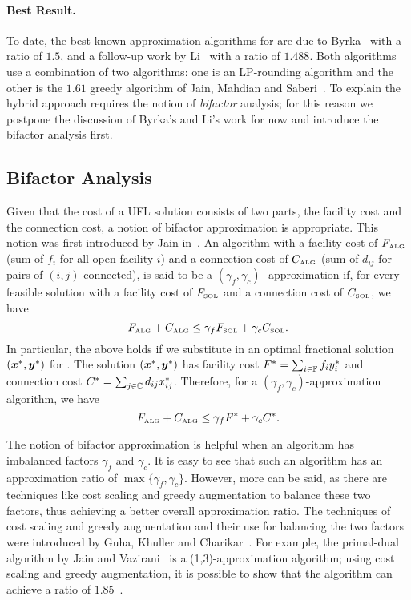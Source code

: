 \documentclass[oneside,final]{ucr}
\begin{document}
\paragraph{Best Result.} To date, the best-known
approximation algorithms for {\UFL} are due to
Byrka~\cite{Byrka07} with a ratio of $1.5$, and a follow-up
work by Li~\cite{Li11} with a ratio of $1.488$. Both
algorithms use a combination of two algorithms: one is an
LP-rounding algorithm and the other is the $1.61$ greedy
algorithm of Jain, Mahdian and Saberi~\cite{JainMS02}. To
explain the hybrid approach requires the notion of
\emph{bifactor} analysis; for this reason we postpone the
discussion of Byrka's and Li's work for now and introduce
the bifactor analysis first.

\subsection{Bifactor Analysis} \label{subsec: bifactor}
Given that the cost of a UFL solution consists of two parts,
the facility cost and the connection cost, a notion of
bifactor approximation is appropriate. This notion was first
introduced by Jain {\etal} in~\cite{JainMMSV03}. An
algorithm with a facility cost of $F_{\mbox{\tiny\rm ALG}}$ (sum of
$f_i$ for all open facility $i$) and a connection cost of
$C_{\mbox{\tiny\rm ALG}}$ (sum of $d_{ij}$ for pairs of $(i,j)$
connected), is said to be a $(\gamma_f,\gamma_c)$-
approximation if, for every feasible solution {\SOL} with a
facility cost of $F_{{{\mbox{\tiny\rm SOL}}}}$ and a connection cost of
$C_{{{\mbox{\tiny\rm SOL}}}}$, we have
\begin{equation*}
  F_{\mbox{\tiny\rm ALG}} + C_{\mbox{\tiny\rm ALG}} \leq \gamma_f F_{{{\mbox{\tiny\rm SOL}}}} +
  \gamma_c C_{{{\mbox{\tiny\rm SOL}}}}.
\end{equation*}
In particular, the above holds if we substitute in an
optimal fractional solution $(\boldsymbol{x}^\ast,\boldsymbol{y}^\ast)$ for
{\SOL}. The solution $(\boldsymbol{x}^\ast,\boldsymbol{y}^\ast)$ has facility
cost $F^\ast = \sum_{i\in\mathbb{F}} f_i y_i^\ast$ and
connection cost $C^\ast = \sum_{j\in\mathbb{C}} d_{ij}
x_{ij}^\ast$. Therefore, for a
$(\gamma_f,\gamma_c)$-approximation algorithm, we have
\begin{equation*}
  F_{\mbox{\tiny\rm ALG}} + C_{\mbox{\tiny\rm ALG}} \leq \gamma_f F^\ast +
  \gamma_c C^\ast.
\end{equation*}

The notion of bifactor approximation is helpful when an
algorithm has imbalanced factors $\gamma_f$ and
$\gamma_c$. It is easy to see that such an algorithm has an
approximation ratio of $\max\{\gamma_f,
\gamma_c\}$. However, more can be said, as there are
techniques like cost scaling and greedy augmentation to
balance these two factors, thus achieving a better overall
approximation ratio. The techniques of cost scaling and
greedy augmentation and their use for balancing the two
factors were introduced by Guha, Khuller and
Charikar~\cite{GuhaK98, CharikarG05}. For example, the
primal-dual algorithm by Jain and Vazirani~\cite{JainV03} is
a (1,3)-approximation algorithm; using cost scaling and
greedy augmentation, it is possible to show that the
algorithm can achieve a ratio of $1.85$~\cite{CharikarG05}.
\end{document}
